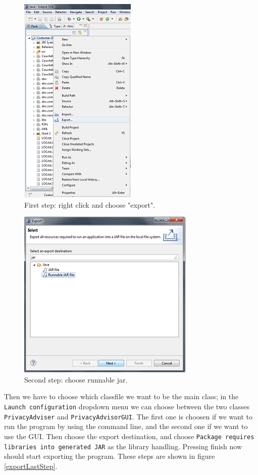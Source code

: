   \begin{figure}
	\begin{centering}
    \includegraphics{Documentation/export.png}
    \caption{First step: right click and choose "export".}
    \label{exportFirstStep}
    \end{centering}
  \end{figure}


  \begin{figure}
  \begin{centering}
    \includegraphics{Documentation/export_jar.png}
    \caption{Second step: choose runnable jar.}
    \label{exportSecondStep}
    \end{centering}
  \end{figure}


Then we have to choose which classfile we want to be the main class; in the \texttt{Launch configuration} dropdown menu we can choose between the two classes \texttt{PrivacyAdviser} and \texttt{PrivacyAdvisorGUI}. The first one is choosen if we want to run the program by using the command line, and the second one if we want to use the GUI. Then choose the export destination, and choose \texttt{Package requires libraries into generated JAR} as the library handling. Pressing finish now should start exporting the program. These steps are shown in figure \ref{exportLastStep}.


